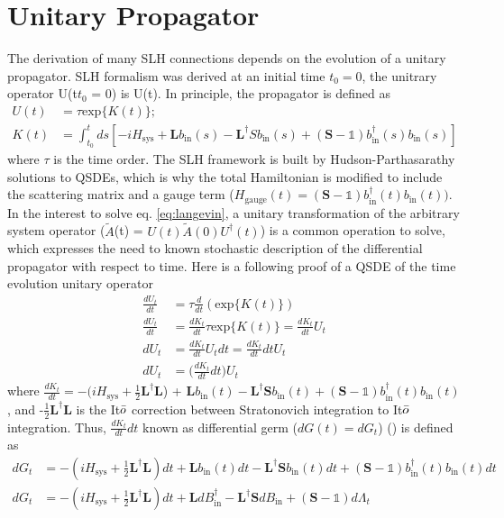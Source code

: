 \documentclass[a4paper]{article}
\theoremstyle{definition}
\begin{document}
\section*{Unitary Propagator}
The derivation of many SLH connections depends on the evolution of a unitary propagator. SLH formalism was derived at an initial time $t_0 = 0$, the unitrary operator U(t$t_0$ = 0) is U(t). In principle, the propagator is defined as
\begin{align}
\label{eq:propagator}
    U(t) & = \tau \text{exp}\{K(t)\}; \nonumber \\
    K(t) & = \int_{t_0}^t ds[-iH_{\text{sys}} + \textbf{L}b_{\text{in}}(s)-\textbf{L}^\dagger S b_{\text{in}}(s) + (\textbf{S}-\mathbb{1})b^\dagger_{\text{in}}(s)b_{\text{in}}(s)]
\end{align}
where $\tau $ is the time order. The SLH framework is built by Hudson-Parthasarathy solutions to QSDEs, which is why the total Hamiltonian is modified to include the scattering matrix and a gauge term ($ H_{\text{gauge}}(t) = (\textbf{S}-\mathbb{1})b^\dagger_{\text{in}}(t)b_{\text{in}}(t))$. In the interest to solve eq. \ref{eq:langevin}, a unitary transformation of the arbitrary system operator ($\tilde{A}$(t) = $U(t)\tilde{A}(0)U^\dagger(t)$) is a common operation to solve, which expresses the need to known stochastic description of the differential propagator with respect to time. Here is a following proof of a QSDE of the time evolution unitary operator
\begin{align}
    \frac{dU_t}{dt} & = \tau \frac{d}{dt}(\text{exp}\{K(t)\}) \nonumber \\
    \frac{dU_t}{dt} & = \frac{dK_t}{dt} \tau \text{exp}\{K(t)\} = \frac{dK_t}{dt}U_t \nonumber \\
     dU_t & = \frac{dK_t}{dt}U_t dt = \frac{dK_t}{dt} dt U_t \nonumber \\
     dU_t & =  \Bigg( \frac{dK_t}{dt} dt \Bigg) U_t
\end{align}
where $\frac{dK_t}{dt} = -(iH_{\text{sys}} + \frac{1}{2}\textbf{L}^\dagger$\textbf{L}) + $ \textbf{L}b_{\text{in}}(t)-\textbf{L}^\dagger \textbf{S} 
b_{\text{in}}(t) + (\textbf{S}-\mathbb{1})b^\dagger_{\text{in}}(t)b_{\text{in}}(t)$, and
-$\frac{1}{2}\textbf{L}^\dagger \textbf{L}$ is the It$\Bar{o}$ correction between Stratonovich integration to It$\Bar{o}$ integration. Thus, $\frac{dK_t}{dt} dt$  known as differential germ ($dG(t) = dG_t$) (\cite{Fagnola_2019}) is defined as
\begin{align}
    dG_t & = -(iH_{\text{sys}} + \frac{1}{2}\textbf{L}^\dagger \textbf{L})dt + \textbf{L}b_{\text{in}}(t)dt-\textbf{L}^\dagger \textbf{S} b_{\text{in}}(t)dt + (\textbf{S}-\mathbb{1})b^\dagger_{\text{in}}(t)b_{\text{in}}(t) dt \nonumber \\
    dG_t & = -(iH_{\text{sys}} + \frac{1}{2}\textbf{L}^\dagger \textbf{L})dt + \textbf{L} dB^\dagger_\text{in} - \textbf{L}^\dagger \textbf{S} dB_\text{in} + (\textbf{S}-\mathbb{1})d\Lambda_t \label{eq:differential_germ}
\end{align}
\end{document}
